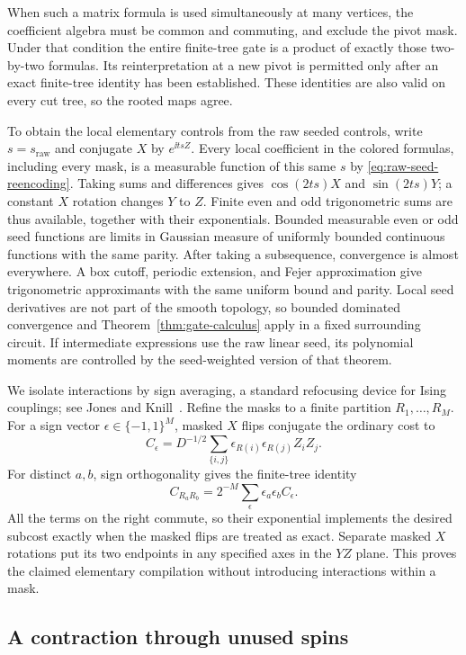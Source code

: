 When such a matrix formula is used simultaneously at many vertices,
the coefficient algebra must be common and commuting, and exclude
the pivot mask.  Under that condition the entire finite-tree gate is
a product of exactly those two-by-two formulas.  Its reinterpretation
at a new pivot is permitted only after an exact finite-tree identity
has been established.  These identities are also valid on every cut
tree, so the rooted maps agree.

To obtain the local elementary controls from the raw seeded controls,
write \(s=s_{\mathrm{raw}}\) and conjugate \(X\) by
\(e^{\ii t sZ}\).  Every local coefficient in the colored formulas,
including every mask, is a measurable function of this same \(s\)
by \eqref{eq:raw-seed-reencoding}.  Taking sums and differences
gives \(\cos(2ts)X\) and \(\sin(2ts)Y\); a constant \(X\)
rotation changes \(Y\) to \(Z\).  Finite even and odd trigonometric
sums are thus available, together with their exponentials.  Bounded
measurable even or odd seed functions are limits in Gaussian measure
of uniformly bounded continuous functions with the same parity.
After taking a subsequence, convergence is almost everywhere.  A box
cutoff, periodic extension, and Fejer approximation give trigonometric
approximants with the same uniform bound and parity.  Local seed
derivatives are not part of the smooth topology, so bounded dominated
convergence and Theorem~\ref{thm:gate-calculus} apply in a fixed
surrounding circuit.  If intermediate expressions use the raw linear
seed, its polynomial moments are controlled by the seed-weighted
version of that theorem.

We isolate interactions by sign averaging, a standard refocusing
device for Ising couplings; see Jones and
Knill~\cite[Section~II]{JonesKnill1999}.  Refine the masks to a finite
partition \(R_1,\ldots,R_M\).  For a sign vector
\(\epsilon\in\{-1,1\}^M\), masked \(X\) flips conjugate the
ordinary cost to
\[
 C_\epsilon=D^{-1/2}\sum_{\{i,j\}}
       \epsilon_{R(i)}\epsilon_{R(j)}Z_iZ_j.
\]
For distinct \(a,b\), sign orthogonality gives the finite-tree
identity
\[
 C_{R_aR_b}=2^{-M}\sum_\epsilon\epsilon_a\epsilon_b C_\epsilon.
\]
All the terms on the right commute, so their exponential implements
the desired subcost exactly when the masked flips are treated as
exact.  Separate masked \(X\) rotations put its two endpoints in any
specified axes in the \(YZ\) plane.  This proves the claimed
elementary compilation without introducing interactions within a
mask.

\subsection{A contraction through unused spins}

